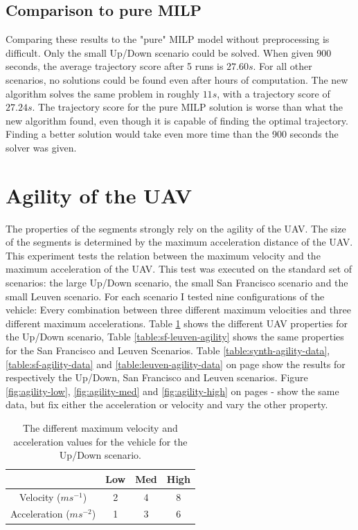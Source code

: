 \subsection{Comparison to pure MILP}
Comparing these results to the "pure" MILP model without preprocessing is difficult. Only the small Up/Down scenario could be solved. When given 900 seconds, the average trajectory score after 5 runs is $27.60s$. For all other scenarios, no solutions could be found even after hours of computation. The new algorithm solves the same problem in roughly $11s$, with a trajectory score of $27.24s$. The trajectory score for the pure MILP solution is worse than what  the new algorithm found, even though it is capable of finding the optimal trajectory. Finding a better solution would take even more time than the 900 seconds the solver was given.
\clearpage
\section{Agility of the UAV}
\label{subsec:agility}
The properties of the segments strongly rely on the agility of the UAV. The size of the segments is determined by the maximum acceleration distance of the UAV. \\
This experiment tests the relation between the maximum velocity and the maximum acceleration of the UAV. This test was executed on the standard set of scenarios: the large Up/Down scenario, the small San Francisco scenario and the small Leuven scenario. For each scenario I tested nine configurations of the vehicle: Every combination between three different maximum velocities and three different maximum accelerations. Table \ref{table:synth-agility} shows the different UAV properties for the Up/Down scenario, Table \ref{table:sf-leuven-agility} shows the same properties for the San Francisco and Leuven Scenarios. Table \ref{table:synth-agility-data}, \ref{table:sf-agility-data} and \ref{table:leuven-agility-data} on page \pageref{table:sf-agility-data} show the results for respectively the Up/Down, San Francisco and Leuven scenarios. Figure \ref{fig:agility-low}, \ref{fig:agility-med} and \ref{fig:agility-high} on pages \pageref{fig:agility-low}-\pageref{fig:agility-high} show the same data, but fix either the acceleration or velocity and vary the other property. \\

\begin{table}[h]
\centering
\begin{tabular}{ c || c | c | c}
 & Low & Med & High \\
\hline\hline
Velocity ($ms^{-1}$) 	& 2		& 4		& 8 	\\ 
\hline
Acceleration ($ms^{-2}$)& 1		& 3 	& 6 	\\  
\end{tabular}
\caption{The different maximum velocity and acceleration values for the vehicle for the Up/Down scenario.}
\label{table:synth-agility}
\end{table}

